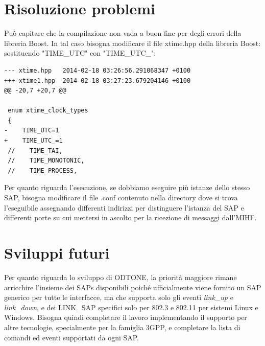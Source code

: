 \section{Risoluzione problemi}
Può capitare che la compilazione non vada a buon fine per degli errori della libreria Boost. In tal caso bisogna modificare il file xtime.hpp della libreria Boost:\\
sostituendo "TIME\_UTC" con "TIME\_UTC\_":\\
\begin{verbatim}
--- xtime.hpp   2014-02-18 03:26:56.291068347 +0100
+++ xtime1.hpp  2014-02-18 03:27:23.679204146 +0100
@@ -20,7 +20,7 @@

 enum xtime_clock_types
 {
-    TIME_UTC=1
+    TIME_UTC_=1
 //    TIME_TAI,
 //    TIME_MONOTONIC,
 //    TIME_PROCESS,
\end{verbatim}

Per quanto riguarda l'esecuzione, se dobbiamo eseguire più istanze dello stesso SAP, bisogna modificare il file .conf contenuto nella directory dove si trova l'eseguibile assegnando differenti indirizzi per distinguere l'istanza del SAP e differenti porte su cui mettersi in ascolto per la ricezione di messaggi dall'MIHF.

\section{Sviluppi futuri}
Per quanto riguarda lo sviluppo di ODTONE, la priorità maggiore rimane arricchire l'insieme dei SAPs disponibili poiché ufficialmente viene fornito un SAP generico per tutte le interfacce, ma che supporta solo gli eventi {\em link\_up} e {\em link\_down}, e dei LINK\_SAP specifici solo per 802.3 e 802.11 per sistemi Linux e Windows. Bisogna quindi completare il lavoro implementando il supporto per altre tecnologie, specialmente per la famiglia 3GPP, e completare la lista di comandi ed eventi supportati da ogni SAP.